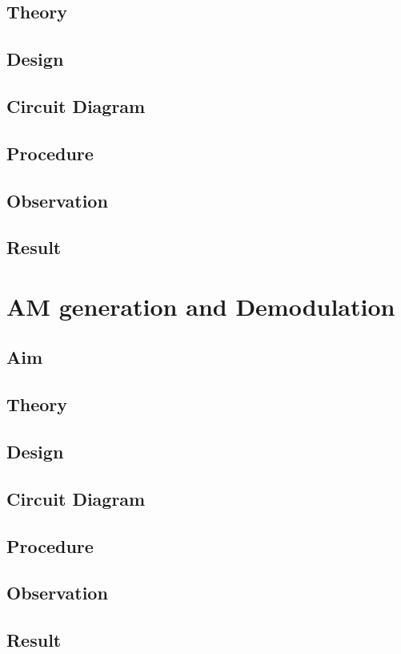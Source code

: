 \documentclass{book}
\begin{document}
\section*{Theory}
\section*{Design}
\section*{Circuit Diagram}
\section*{Procedure}
\section*{Observation}
\section*{Result}

\chapter[AM generation and Demodulation]{AM generation and Demodulation}
\section*{Aim}
\section*{Theory}
\section*{Design}
\section*{Circuit Diagram}
\section*{Procedure}
\section*{Observation}
\section*{Result}
\end{document}
